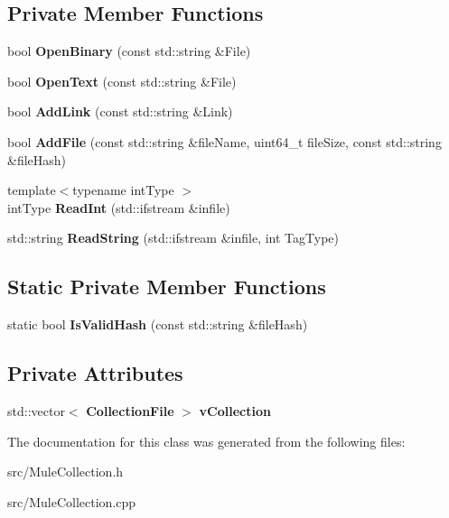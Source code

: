 \subsection*{Private Member Functions}
\begin{DoxyCompactItemize}
\item 
bool {\bfseries OpenBinary} (const std::string \&File)\label{classCMuleCollection_a444b8db69ac52dc054548d1df1a6313b}

\item 
bool {\bfseries OpenText} (const std::string \&File)\label{classCMuleCollection_acef8ee75fbdae451e38984044418314c}

\item 
bool {\bfseries AddLink} (const std::string \&Link)\label{classCMuleCollection_ac79b51221435dfe4042c728188481a40}

\item 
bool {\bfseries AddFile} (const std::string \&fileName, uint64\_\-t fileSize, const std::string \&fileHash)\label{classCMuleCollection_aca9d4ee6fd7b35a6d451ad3377af35a8}

\item 
{\footnotesize template$<$typename intType $>$ }\\intType {\bfseries ReadInt} (std::ifstream \&infile)\label{classCMuleCollection_a336e4d29d481dc2187b43f54a0ca6a50}

\item 
std::string {\bfseries ReadString} (std::ifstream \&infile, int TagType)\label{classCMuleCollection_a45672115a65f9c855a3bc68751200223}

\end{DoxyCompactItemize}
\subsection*{Static Private Member Functions}
\begin{DoxyCompactItemize}
\item 
static bool {\bfseries IsValidHash} (const std::string \&fileHash)\label{classCMuleCollection_a5825af7927b217d44d6299ec2e62b570}

\end{DoxyCompactItemize}
\subsection*{Private Attributes}
\begin{DoxyCompactItemize}
\item 
std::vector$<$ {\bf CollectionFile} $>$ {\bfseries vCollection}\label{classCMuleCollection_a27f31b07ae18efcfaee27604965d6620}

\end{DoxyCompactItemize}


The documentation for this class was generated from the following files:\begin{DoxyCompactItemize}
\item 
src/MuleCollection.h\item 
src/MuleCollection.cpp\end{DoxyCompactItemize}
